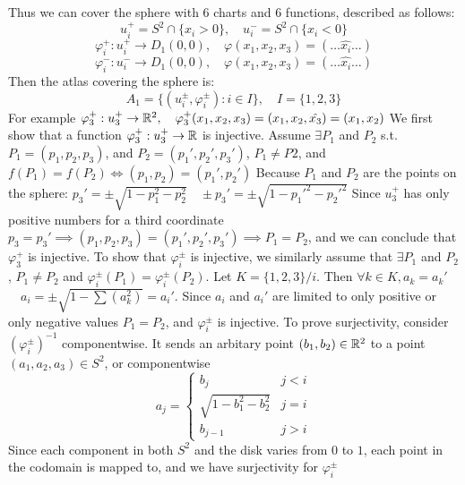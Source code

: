 \documentclass[11pt,a4paper]{report}
\begin{document}
Thus we can cover the sphere with 6 charts and 6 functions, described as follows:
$$ u_i^{+} = S^2 \cap \{x_i > 0 \}, \quad u_i^{-} = S^2 \cap \{x_i < 0 \} $$
$$ \varphi_i^{+}: u_i^{+} \to D_{1}(0,0), \quad \varphi(x_1,x_2,x_3) = (\dots \hat{x_i} \dots)$$
$$ \varphi_i^{-}: u_i^{-} \to D_{1}(0,0), \quad \varphi(x_1,x_2,x_3) = (\dots \hat{x_i} \dots)$$
Then the atlas covering the sphere is:
$$ A_1 = \{(u_i^{\pm},\varphi_i^{\pm}) : i \in I \}, \quad I = \{ 1,2,3 \} $$
For example $\varphi_3^{+}: u_3^{+} \to \mathbb{R}^2, \quad \varphi_3^{+}(x_1,x_2,x_3) = (x_1,x_2,\hat{x_3}) =(x_1,x_2)$
\newline
\newline
We first show that a function $\varphi_3^{+}: u_3^{+} \to \mathbb{R}$ is injective. Assume $\exists P_1$ and $P_2$ s.t. $P_1 = (p_1,p_2,p_3)$,
and $P_2 = (p_1\prime,p_2\prime,p_3\prime)$, $P_1 \neq P2$, and $f(P_1) = f(P_2) \iff  (p_1,p_2) = (p_1\prime, p_2\prime)$
\newline
Because $P_1$ and $P_2$ are the points on the sphere:
$p_3\prime = \pm \sqrt{1-p_1^2-p_2^2} \quad \pm p_3\prime = \pm \sqrt{1-p_1\prime^2-p_2\prime^2}$
Since $u_3^{+}$ has only positive numbers for a third coordinate $p_3 = p_3\prime \implies (p_1,p_2,p_3) = (p_1\prime,p_2\prime,p_3\prime) \implies P_1=P_2$, and we can conclude that $\varphi_3^{+}$ is injective.
\newline
\newline
To show that $\varphi_i^{\pm}$ is injective, we similarly assume that $ \exists P_1$ and $P_2$, $P_1 \neq P_2$ and 
$\varphi_i^{\pm}(P_1) = \varphi_i^{\pm}(P_2)$. Let $K= \{1,2,3\}/i$. Then $\forall k \in K, a_k= a_k\prime$ 
$\quad a_i = \pm \sqrt{1-\sum(a_k^2)} = a_i\prime$. Since $a_i$ and $a_i\prime$ are limited to only positive or only negative values  $P_1 = P_2$, and $\varphi_i^{\pm}$ is injective.
\newline
\newline
To prove surjectivity, consider $(\varphi_i^{\pm})^{-1}$ componentwise. It sends an arbitary point $(b_1,b_2) \in \mathbb{R}^2$ to a point $(a_1,a_2,a_3) \in S^2$, or componentwise
\[
  a_j =
  \begin{cases}
                                   b_j & j<i \\
                                   \sqrt{1-b_1^2-b_2^2} & j=i \\
                                   b_{j-1} & j>i
  \end{cases}
\]
Since each component in both $S^2$ and the disk varies from $0$ to $1$, each point in the codomain is mapped to, and we have surjectivity for $\varphi_i^{\pm}$
\end{document}
